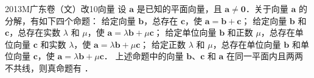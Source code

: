 
\begin{problem}{2013}{M}{广东卷（文）改}{10}{向量}
设 $ \boldsymbol{a} $ 是已知的平面向量，且 $ \boldsymbol{a}\neq\boldsymbol{0} $．关于向量 $ \boldsymbol{a} $ 的分解，有如下四个命题：  
 给定向量 $ \boldsymbol{b} $，总存在 $ \boldsymbol{c} $，使 $ \boldsymbol{a}=\boldsymbol{b}+\boldsymbol{c} $；  
 给定向量 $ \boldsymbol{b} $ 和 $ \boldsymbol{c} $，总存在实数 $ \lambda $ 和 $ \mu $，使 $ \boldsymbol{a}=\lambda\boldsymbol{b}+\mu\boldsymbol{c} $；  
 给定单位向量 $ \boldsymbol{b} $ 和正数 $ \mu $，总存在单位向量 $ \boldsymbol{c} $ 和实数 $ \lambda $，使 $ \boldsymbol{a}=\lambda\boldsymbol{b}+\mu\boldsymbol{c} $；  
 给定正数 $ \lambda $ 和 $ \mu $，总存在单位向量 $ \boldsymbol{b} $ 和单位向量 $ \boldsymbol{c} $，使 $ \boldsymbol{a}=\lambda\boldsymbol{b}+\mu\boldsymbol{c} $．  
上述命题中的向量 $ \boldsymbol{b} $、$ \boldsymbol{c} $ 和 $ \boldsymbol{a} $ 在同一平面内且两两不共线，则真命题有 \underline{\hspace{4em}}．
\end{problem}

\begin{answer}

\end{answer}

\begin{solutions}

\end{solutions}
